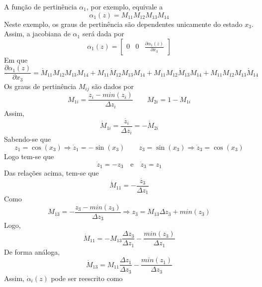 A função de pertinência $\alpha_1$, por exemplo, equivale a
\begin{equation*}
\alpha_1(z) = M_{11}M_{12}M_{13}M_{14}
\end{equation*}
Neste exemplo, os graus de pertinência são dependentes unicamente do estado $x_3$. Assim, a jacobiana de $\alpha_1$ será dada por
\begin{equation*}
\alpha_1(z) = \begin{bmatrix}0&0&\frac{\partial\alpha_1(z)}{\partial x_3}\end{bmatrix}
\end{equation*}
Em que 
\begin{equation*}
\frac{\partial\alpha_1(z)}{\partial x_3} = \dot{M}_{11}M_{12}M_{13}M_{14}+M_{11}\dot{M}_{12}M_{13}M_{14}+M_{11}M_{12}\dot{M}_{13}M_{14}+M_{11}M_{12}M_{13}\dot{M}_{14}
\end{equation*}
Os graus de pertinência $M_{ij}$ são dados por
\begin{equation*}
M_{1i} = \dfrac{z_i-min(z_i)}{\Delta z_i}\qquad M_{2i}= 1 -  M_{1i}
\end{equation*}
Assim,
\begin{equation*}
\dot{M}_{1i} = \dfrac{\dot{z_i}}{\Delta z_i} = -\dot{M}_{2i}
\end{equation*}
Sabendo-se que
\begin{equation*}
z_1 = \cos(x_3) \Rightarrow \dot{z}_1 = -\sin(x_3)\qquad z_3 = \sin(x_3) \Rightarrow \dot{z}_3 = \cos(x_3)
\end{equation*}
Logo tem-se que
\begin{equation*}
\dot{z}_1 = -z_3\quad\text{e}\quad\dot{z}_3 = z_1
\end{equation*}
Das relações acima, tem-se que
\begin{equation*}
\dot{M}_{11}= -\dfrac{\dot{z_3}}{\Delta z_1}
\end{equation*}
Como
\begin{equation*}
{M}_{13}= -\dfrac{z_3-min(z_3)}{\Delta z_3}\Rightarrow z_3 = {M}_{13}\Delta z_3+min(z_3)
\end{equation*}
Logo,
\begin{equation*}
\dot{M}_{11} = -{M}_{13}\dfrac{\Delta z_3}{\Delta z_1}-\dfrac{min(z_3)}{\Delta z_1}
\end{equation*}
De forma análoga,
\begin{equation*}
\dot{M}_{13} = {M}_{11}\dfrac{\Delta z_1}{\Delta z_3}-\dfrac{min(z_1)}{\Delta z_3}
\end{equation*}
Assim, $\dot{\alpha}_i(z)$ pode ser reescrito como

